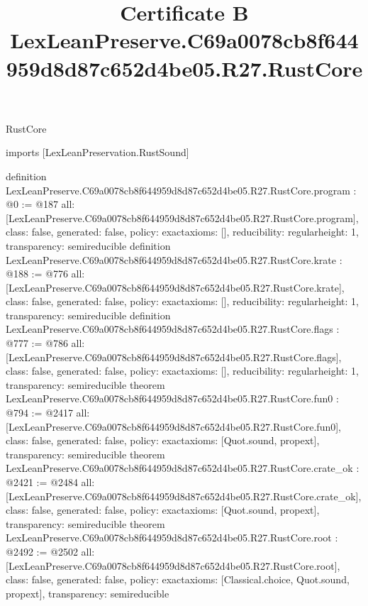 \begin{lexlean}{RustCore}
\title{Certificate B LexLeanPreserve.C69a0078cb8f644959d8d87c652d4be05.R27.RustCore}
\begin{coremodule}
imports [LexLeanPreservation.RustSound]

definition LexLeanPreserve.C69a0078cb8f644959d8d87c652d4be05.R27.RustCore.program : @0 := @187 {
  all: [LexLeanPreserve.C69a0078cb8f644959d8d87c652d4be05.R27.RustCore.program],
  class: false,
  generated: false,
  policy: exact{axioms: []},
  reducibility: regular{height: 1},
  transparency: semireducible
}
definition LexLeanPreserve.C69a0078cb8f644959d8d87c652d4be05.R27.RustCore.krate : @188 := @776 {
  all: [LexLeanPreserve.C69a0078cb8f644959d8d87c652d4be05.R27.RustCore.krate],
  class: false,
  generated: false,
  policy: exact{axioms: []},
  reducibility: regular{height: 1},
  transparency: semireducible
}
definition LexLeanPreserve.C69a0078cb8f644959d8d87c652d4be05.R27.RustCore.flags : @777 := @786 {
  all: [LexLeanPreserve.C69a0078cb8f644959d8d87c652d4be05.R27.RustCore.flags],
  class: false,
  generated: false,
  policy: exact{axioms: []},
  reducibility: regular{height: 1},
  transparency: semireducible
}
theorem LexLeanPreserve.C69a0078cb8f644959d8d87c652d4be05.R27.RustCore.fun0 : @794 := @2417 {
  all: [LexLeanPreserve.C69a0078cb8f644959d8d87c652d4be05.R27.RustCore.fun0],
  class: false,
  generated: false,
  policy: exact{axioms: [Quot.sound, propext]},
  transparency: semireducible
}
theorem LexLeanPreserve.C69a0078cb8f644959d8d87c652d4be05.R27.RustCore.crate_ok : @2421 := @2484 {
  all: [LexLeanPreserve.C69a0078cb8f644959d8d87c652d4be05.R27.RustCore.crate_ok],
  class: false,
  generated: false,
  policy: exact{axioms: [Quot.sound, propext]},
  transparency: semireducible
}
theorem LexLeanPreserve.C69a0078cb8f644959d8d87c652d4be05.R27.RustCore.root : @2492 := @2502 {
  all: [LexLeanPreserve.C69a0078cb8f644959d8d87c652d4be05.R27.RustCore.root],
  class: false,
  generated: false,
  policy: exact{axioms: [Classical.choice, Quot.sound, propext]},
  transparency: semireducible
}


\end{coremodule}
\end{lexlean}
